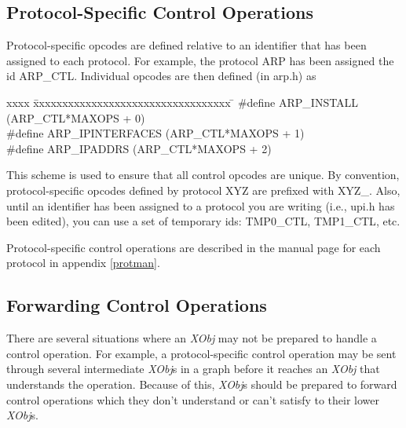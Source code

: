 \subsection{ Protocol-Specific Control Operations }

Protocol-specific opcodes are defined relative to an identifier that
has been assigned to each protocol. For example, the protocol ARP
has been assigned the id {\sanss ARP\_CTL}. Individual opcodes are
then defined (in {\sanss arp.h}) as

\begin{tt}\begin{tabbing}
xxxx \= xxxxxxxxxxxxxxxxxxxxxxxxxxxxxxxxxx \= \kill
\> \#define ARP\_INSTALL \> (ARP\_CTL*MAXOPS + 0)\\
\> \#define ARP\_IPINTERFACES \> (ARP\_CTL*MAXOPS + 1)\\
\> \#define ARP\_IPADDRS \> (ARP\_CTL*MAXOPS + 2)
\end{tabbing}\end{tt}

\noindent This scheme is used to ensure that all control opcodes
are unique. By convention, protocol-specific opcodes defined by
protocol XYZ are prefixed with {\sanss XYZ\_}. Also, until an identifier
has been assigned to a protocol you are writing (i.e., {\sanss upi.h} has
been edited), you can use a set of temporary ids: {\sanss TMP0\_CTL},
{\sanss TMP1\_CTL}, etc.

Protocol-specific control operations are described in the manual page
for each protocol in appendix \ref{protman}.

\subsection { Forwarding Control Operations }

There are several situations where an {\em XObj} may not be prepared to
handle a control operation.  For example, a protocol-specific control
operation may be sent through several intermediate {\em XObj}s in a graph
before it reaches an {\em XObj} that understands the operation.  Because
of this, {\em XObj}s should be prepared to forward control operations
which they don't understand or can't satisfy to their lower {\em XObj}s.


